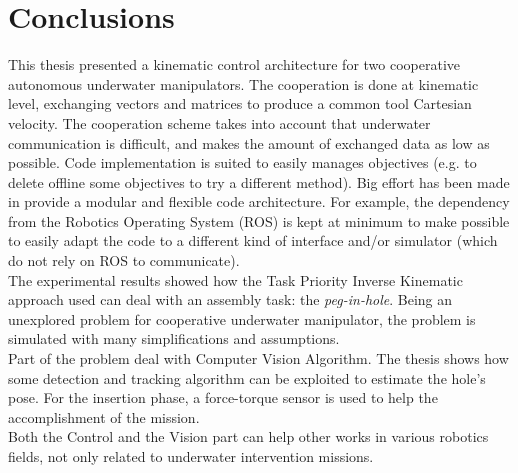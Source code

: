 \chapter{Conclusions}
\label{chap:conclusions}
\ifpdf
    \graphicspath{{Conclusions/Figures/PNG/}{Conclusions/Figures/PDF/}{Conclusions/Figures/}}
\else
    \graphicspath{{Conclusions/Figures/EPS/}{Conclusions/Figures/}}
\fi

This thesis presented a kinematic control architecture for two cooperative autonomous underwater manipulators. The cooperation is done at kinematic level, exchanging vectors and matrices to produce a common tool Cartesian velocity. The cooperation scheme takes into account that underwater communication is difficult, and makes the amount of exchanged data as low as possible. Code implementation is suited to easily manages objectives (e.g. to delete offline some objectives to try a different method). Big effort has been made in provide a modular and flexible code architecture. For example, the dependency from the Robotics Operating System (ROS) is kept at minimum to make possible to easily adapt the code to a different kind of interface and/or simulator (which do not rely on ROS to communicate).\\
 The experimental results showed how the Task Priority Inverse Kinematic approach used can deal with an assembly task: the \textit{peg-in-hole}. Being an unexplored problem for cooperative underwater manipulator, the problem is simulated with many simplifications and assumptions.\\
Part of the problem deal with Computer Vision Algorithm. The thesis shows how some detection and tracking algorithm can be exploited to estimate the hole's pose. For the insertion phase, a force-torque sensor is used to help the accomplishment of the mission.\\
Both the Control and the Vision part can help other works in various robotics fields, not only related to underwater intervention missions.\\

